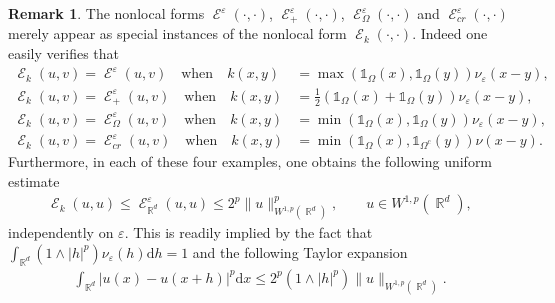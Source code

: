 \documentclass[12pt, reqno]{amsart}%
\theoremstyle{plain}  %
\theoremstyle{definition}  %
\newtheorem{remark}[theorem]{Remark}   %
\numberwithin{equation}{section}
\DeclareMathOperator{\cE}{\mathcal{E}}
\DeclareMathOperator{\R}{\mathbb{R}}
\renewcommand{\d}{\mathrm{d}}
\newcommand{\eps}{\varepsilon}
\begin{document}
\begin{remark} The nonlocal forms $\cE^\eps(\cdot,\cdot)$,  $\cE^\eps_+(\cdot,\cdot)$, $\cE^\eps_\Omega(\cdot,\cdot)$  and  $\cE^\eps_{cr}(\cdot,\cdot)$ merely appear as special instances of the nonlocal form $\cE_k(\cdot,\cdot)$. Indeed one easily verifies that
\begin{align*}
\cE_k (u, v)=\cE^\eps(u, v)\quad \text{when}\quad k(x,y)
&= \max( \mathds{1}_{\Omega} (x),\mathds{1}_{\Omega} (y))\nu_\eps(x-y),\\
\cE_k (u, v)=\cE^\eps_+(u, v)\quad \text{when}\quad k(x,y)&= \tfrac{1}{2}(\mathds{1}_{\Omega} (x)+\mathds{1}_{\Omega} (y))\nu_\eps(x-y),\\
\cE_k (u, v)=\cE^\eps_\Omega(u, v)\quad \text{when}\quad k(x,y)&= \min( \mathds{1}_{\Omega} (x),\mathds{1}_{\Omega} (y))\nu_\eps(x-y),\\
\cE_k (u, v)=\cE^\eps_{cr}(u, v)\quad \text{when}\quad k(x,y)&= \min( \mathds{1}_{\Omega} (x),\mathds{1}_{\Omega^c} (y))\nu(x-y).
\end{align*}
Furthermore, in each of these four examples, one obtains the following uniform estimate
\begin{align}\label{eq:taylor-exapnsion}
\cE_k(u,u)\leq \cE^\eps_{\R^d}(u,u) \leq 2^p \|u\|^p_{W^{1,p}(\R^d)}, \qquad\text{$u\in W^{1,p}(\R^d)$},
\end{align}
independently on $\eps$. This is  readily implied by the  fact that $\int_{\R^d}(1\land|h|^p)\nu_\eps(h)\d h=1$ and the following Taylor expansion
\begin{align*}
\int_{\R^d}|u(x)-u(x+h)|^p\d x\leq 2^p(1\land |h|^p) \|u\|_{W^{1,p}(\R^d)}.
\end{align*}
\end{remark}
\end{document}
